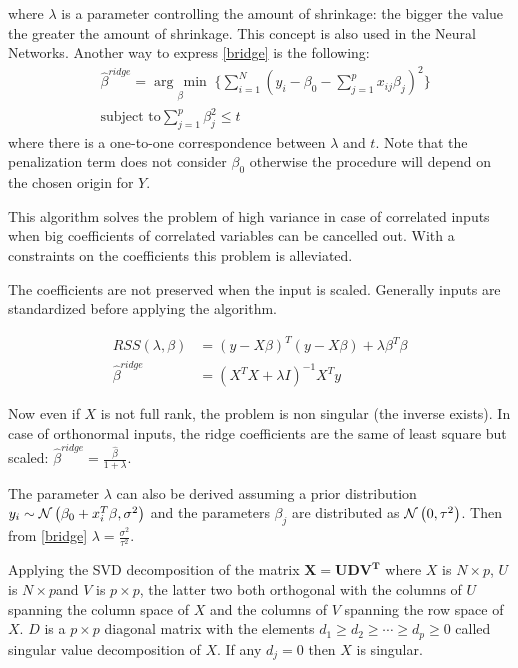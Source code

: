 \documentclass[12pt, letterpaper]{article}
\theoremstyle{definition}
\newcommand{\argmin}[1]{\underset{#1}{\operatorname{arg}\,\operatorname{min}}\;}
\begin{document}
where $\lambda$ is a parameter controlling the amount of shrinkage: the bigger the value the greater the amount of shrinkage. This concept is also used in the Neural Networks. Another way to express \ref{bridge} is the following:
\begin{equation}
\begin{aligned}
&\hat{\beta}^{ridge} = \argmin{\beta} \Bigg\lbrace \sum_{i=1}^N \left( y_i -  \beta_0 - \sum_{j=1}^p x_{ij} \beta_j\right)^2 \Bigg\rbrace\\
&\text{subject to} \sum_{j=1}^p \beta_j^2 \le t
\end{aligned}
\end{equation}
where there is a one-to-one correspondence between $\lambda$ and $t$. Note that the penalization term does not consider $\beta_0$ otherwise the procedure will depend on the chosen origin for $Y$.

This algorithm solves the problem of high variance in case of correlated inputs when big coefficients of correlated variables can be cancelled out. With a constraints on the coefficients this problem is alleviated.

The coefficients are not preserved when the input is scaled. Generally inputs are standardized before applying the algorithm.

\begin{align}
RSS(\lambda, \beta)       &= \left( y - X \beta \right)^T \left( y - X\beta \right) + \lambda \beta^T \beta \\
\hat{\beta}^{ridge} &= \left( X^TX + \lambda I \right)^{-1} X^Ty
\end{align}

Now even if $X$ is not full rank, the problem is non singular (the inverse exists).
In case of orthonormal inputs, the ridge coefficients are the same of least square but scaled: $\hat{\beta}^{ridge}  = \frac{\hat{\beta}}{1+\lambda}$.

The parameter $\lambda$ can also be derived assuming a prior distribution $y_i  \sim  \CMcal{N}\left( \beta_0+x_i^T\beta, \sigma^2\right)$ and the parameters $\beta_j$ are distributed as $\CMcal{N}\left( 0, \tau^2\right)$. Then from \ref{bridge} $\lambda = \frac{\sigma^2}{\tau^2}$.

Applying the SVD decomposition of the matrix $\mathbf{X =  UDV^T}$ where $X$ is $N\times p$, $U$ is $N\times p$and $V$ is $p\times p$, the latter two both orthogonal with the columns of $U$ spanning the column space of $X$ and the columns of $V$ spanning the row space of $X$. $D$ is a $p\times p$ diagonal matrix with the elements $d_1\ge d_2 \ge \cdots \ge d_p\ge 0$ called singular value decomposition of $X$. If any $d_j = 0$ then $X$ is singular.
\end{document}
